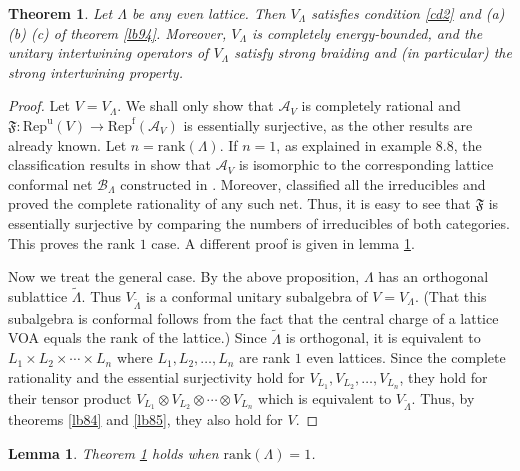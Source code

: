 \documentclass[11pt,b5paper,notitlepage]{article}
\theoremstyle{definition}
\theoremstyle{plain}
\newtheorem{thm}[df]{Theorem}
\newtheorem{lm}[df]{Lemma}
\newcommand{\fk}{\mathfrak}
\newcommand{\mc}{\mathcal}
\newcommand{\wtd}{\widetilde}
\newcommand{\Repu}{\mathrm{Rep}^{\mathrm u}}
\newcommand{\Repf}{\mathrm{Rep}^{\mathrm f}}
\newcommand{\rank}{\mathrm{rank}}
\numberwithin{equation}{subsection}
\begin{document}
\begin{thm}\label{lb96}
Let $\Lambda$ be any even lattice. Then $V_\Lambda$ satisfies condition \ref{cd2} and (a) (b) (c) of theorem \ref{lb94}. Moreover, $V_\Lambda$ is completely energy-bounded, and the unitary intertwining operators of $V_\Lambda$ satisfy strong braiding and (in particular) the strong intertwining property.
\end{thm}

\begin{proof}
Let $V=V_\Lambda$. We shall only show that $\mc A_V$ is completely rational and $\fk F:\Repu(V)\rightarrow\Repf(\mc A_V)$ is essentially surjective, as the other results are already known. Let $n=\rank(\Lambda)$. If $n=1$, as explained in \cite{CKLW18} example 8.8,  the classification results in \cite{BMT88} show that $\mc A_V$ is isomorphic to the corresponding  lattice conformal net $\mc B_\Lambda$ constructed in \cite{DX06}. Moreover, \cite{DX06} classified all the irreducibles  and proved the complete rationality of any such net.  Thus, it is easy to see that $\fk F$ is essentially surjective by comparing the numbers of irreducibles of both categories. This proves the rank $1$ case. A different proof is given in lemma \ref{lb95}.

Now we treat the general case. By the above proposition, $\Lambda$ has an orthogonal sublattice $\wtd \Lambda$. Thus $V_{\wtd\Lambda}$ is a conformal unitary subalgebra of $V=V_\Lambda$. (That this subalgebra is conformal follows from the fact that the central charge of a lattice VOA equals the rank of the lattice.) Since $\wtd\Lambda$ is orthogonal, it is equivalent to $L_1\times L_2\times\cdots\times L_n$ where $L_1,L_2,\dots,L_n$ are rank $1$ even lattices. Since the complete rationality and the essential surjectivity hold for $V_{L_1},V_{L_2},\dots,V_{L_n}$, they hold for their tensor product $V_{L_1}\otimes V_{L_2}\otimes\cdots\otimes V_{L_n}$ which is equivalent to $V_{\wtd \Lambda}$. Thus, by theorems \ref{lb84} and \ref{lb85}, they also hold for $V$.
\end{proof}


\begin{lm}\label{lb95}
Theorem \ref{lb96} holds when $\rank(\Lambda)=1$.
\end{lm}
\end{document}
